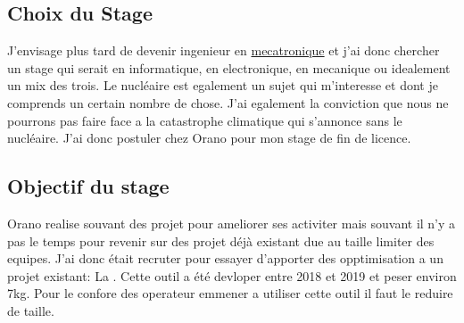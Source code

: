 \subsection{Choix du Stage}
J'envisage plus tard de devenir ingenieur en \href{https://fr.wikipedia.org/wiki/M%C3%A9catronique}{mecatronique} et j'ai donc chercher un stage qui serait en informatique, en electronique, en mecanique ou idealement un mix des trois. Le nucléaire est egalement un sujet qui m'interesse et dont je comprends un certain nombre de chose. J'ai egalement la conviction que nous ne pourrons pas faire face a la catastrophe climatique qui s'annonce sans le nucléaire. J'ai donc postuler chez Orano pour mon stage de fin de licence. 
\subsection{Objectif du stage}

Orano realise souvant des projet pour ameliorer ses activiter mais souvant il n'y a pas le temps pour revenir sur des projet déjà existant due au taille limiter des equipes. J'ai donc était recruter pour essayer d'apporter des opptimisation a un projet existant: La . Cette outil a été devloper entre 2018 et 2019 et peser environ 7kg. Pour le confore des operateur emmener a utiliser cette outil il faut le reduire de taille.